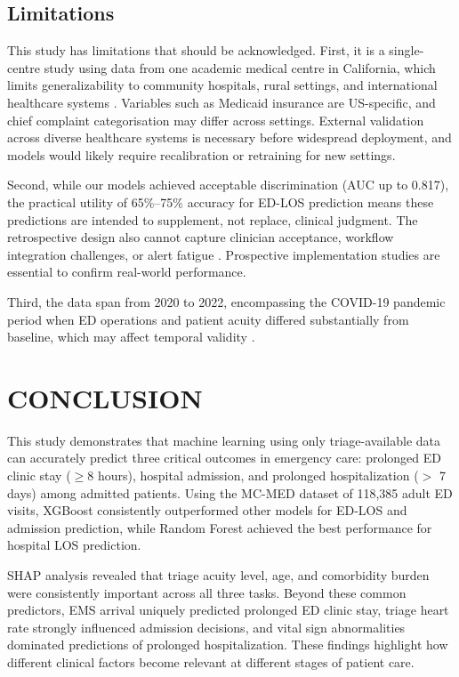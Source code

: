 \documentclass[harvard,article]{frontiersinFPHY_FAMS}
\begin{document}
\subsection{Limitations}

This study has limitations that should be acknowledged. First, it is a single-centre study using data from one academic medical centre in California, which limits generalizability to community hospitals, rural settings, and international healthcare systems \cite{wong2025, cardosi2021}. Variables such as Medicaid insurance are US-specific, and chief complaint categorisation may differ across settings. External validation across diverse healthcare systems is necessary before widespread deployment, and models would likely require recalibration or retraining for new settings.

Second, while our models achieved acceptable discrimination (AUC up to 0.817), the practical utility of 65\%--75\% accuracy for ED-LOS prediction means these predictions are intended to supplement, not replace, clinical judgment. The retrospective design also cannot capture clinician acceptance, workflow integration challenges, or alert fatigue \cite{hosseini2026, raff2024}. Prospective implementation studies are essential to confirm real-world performance.

Third, the data span from 2020 to 2022, encompassing the COVID-19 pandemic period when ED operations and patient acuity differed substantially from baseline, which may affect temporal validity \cite{kansal2025}.

\section{CONCLUSION}

This study demonstrates that machine learning using only triage-available data can accurately predict three critical outcomes in emergency care: prolonged ED clinic stay ($\geq 8$ hours), hospital admission, and prolonged hospitalization ($>$ 7 days) among admitted patients. Using the MC-MED dataset of 118,385 adult ED visits, XGBoost consistently outperformed other models for ED-LOS and admission prediction, while Random Forest achieved the best performance for hospital LOS prediction.

SHAP analysis revealed that triage acuity level, age, and comorbidity burden were consistently important across all three tasks. Beyond these common predictors, EMS arrival uniquely predicted prolonged ED clinic stay, triage heart rate strongly influenced admission decisions, and vital sign abnormalities dominated predictions of prolonged hospitalization. These findings highlight how different clinical factors become relevant at different stages of patient care.
\end{document}

